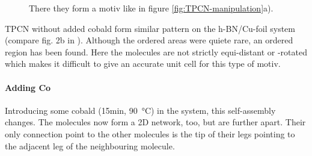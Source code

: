 \newpage
\begin{figure}[!h]
 \centering
\caption{There they form a motiv like in figure \ref{fig:TPCN-manipulation}a).}
\end{figure}

TPCN without added cobald form similar pattern on the h-BN/Cu-foil system (compare fig. 2b in \cite{urgel_controlling_2015}). Although the ordered areas were quiete rare, an ordered region has been found. Here the molecules are not strictly equi-distant or -rotated which makes it difficult to give an accurate unit cell for this type of motiv.

\newpage
\paragraph{Adding Co}
Introducing some cobald (15min, \SI{90}{\celsius}) in the system, this self-assembly changes. The molecules now form a 2D network, too, but are further apart. Their only connection point to the other molecules is the tip of their legs pointing to the adjacent leg of the neighbouring molecule.

